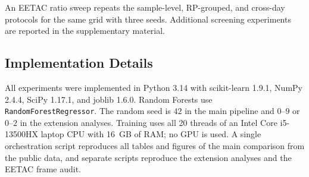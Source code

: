 An EETAC ratio sweep repeats the sample-level, RP-grouped, and cross-day protocols for the same grid with three seeds. Additional screening experiments are reported in the supplementary material.

\subsection{Implementation Details}
\label{subsec:implementation_details}

All experiments were implemented in Python 3.14 with scikit-learn 1.9.1, NumPy 2.4.4, SciPy 1.17.1, and joblib 1.6.0. Random Forests use \texttt{RandomForest}\allowbreak\texttt{Regressor}. The random seed is $42$ in the main pipeline and $0$--$9$ or $0$--$2$ in the extension analyses. Training uses all 20 threads of an Intel Core i5-13500HX laptop CPU with 16~GB of RAM; no GPU is used. A single orchestration script reproduces all tables and figures of the main comparison from the public data, and separate scripts reproduce the extension analyses and the EETAC frame audit.
